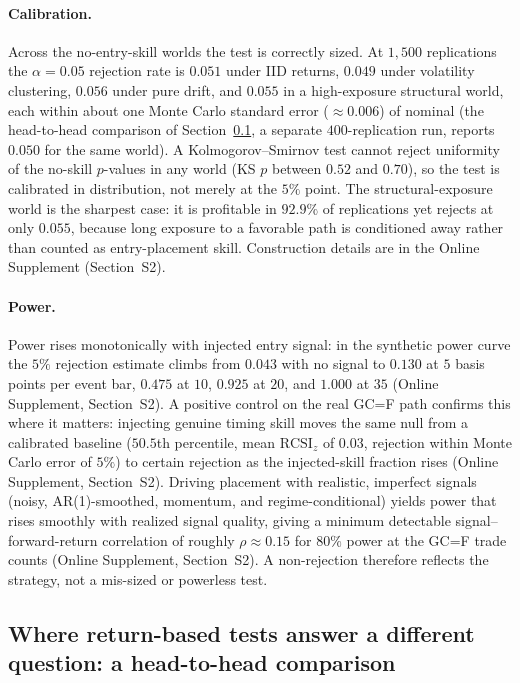 \documentclass[risks,article,submit,pdftex,oneauthor]{Definitions/mdpi}
\begin{document}
\paragraph{Calibration.} Across the no-entry-skill worlds the test is correctly sized. At $1{,}500$ replications the $\alpha=0.05$ rejection rate is $0.051$ under IID returns, $0.049$ under volatility clustering, $0.056$ under pure drift, and $0.055$ in a high-exposure structural world, each within about one Monte Carlo standard error ($\approx 0.006$) of nominal (the head-to-head comparison of Section~\ref{sec:competitor}, a separate $400$-replication run, reports $0.050$ for the same world). A Kolmogorov--Smirnov test cannot reject uniformity of the no-skill $p$-values in any world (KS $p$ between $0.52$ and $0.70$), so the test is calibrated in distribution, not merely at the $5\%$ point. The structural-exposure world is the sharpest case: it is profitable in $92.9\%$ of replications yet rejects at only $0.055$, because long exposure to a favorable path is conditioned away rather than counted as entry-placement skill. Construction details are in the Online Supplement (Section~S2).

\paragraph{Power.} Power rises monotonically with injected entry signal: in the synthetic power curve the $5\%$ rejection estimate climbs from $0.043$ with no signal to $0.130$ at $5$ basis points per event bar, $0.475$ at $10$, $0.925$ at $20$, and $1.000$ at $35$ (Online Supplement, Section~S2). A positive control on the real GC=F path confirms this where it matters: injecting genuine timing skill moves the same null from a calibrated baseline ($50.5$th percentile, mean $\mathrm{RCSI}_z$ of $0.03$, rejection within Monte Carlo error of $5\%$) to certain rejection as the injected-skill fraction rises (Online Supplement, Section~S2). Driving placement with realistic, imperfect signals (noisy, AR(1)-smoothed, momentum, and regime-conditional) yields power that rises smoothly with realized signal quality, giving a minimum detectable signal--forward-return correlation of roughly $\rho\approx0.15$ for $80\%$ power at the GC=F trade counts (Online Supplement, Section~S2). A non-rejection therefore reflects the strategy, not a mis-sized or powerless test.

\subsection{Where return-based tests answer a different question: a head-to-head comparison}
\label{sec:competitor}
\end{document}
